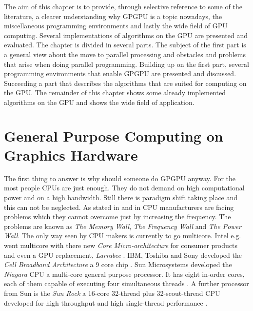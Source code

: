 The aim of this chapter is to provide, through selective reference to some
of the literature, a clearer understanding why \gls{GPGPU} is a topic nowadays,
the miscellaneous programming environments and lastly the wide field of \gls{GPU}
computing. Several implementations of algorithms on the \gls{GPU} are presented
and evaluated. 
The chapter is divided in several parts. The subject of the first part is a
general view about the move to parallel processing and obstacles and problems
that arise when doing parallel programming. Building up on the first part,
several programming environments that enable \gls{GPGPU} are presented and
discussed. Succeeding a part that describes the algorithms that are suited for
computing on the \gls{GPU}. The remainder of this chapter shows some already
implemented algorithms on the \gls{GPU} and shows the wide field of application.




\section{General Purpose Computing on Graphics Hardware} %
\label{sec:gpgpu}

The first thing to answer is why should someone do \gls{GPGPU} anyway. For the
most people \glspl{CPU} are just enough. They do not demand on high
computational power and on a high bandwidth. Still there is paradigm shift
taking place and this can not be neglected. As stated in
\citep{citeulike:1187394} and in \citep{citeulike:3421647} \gls{CPU}
manufacturers are facing problems which they cannot overcome just by increasing
the frequency. The problems are known as \emph{The Memory
Wall}\citep{citeulike:457955}, \emph{The Frequency Wall} and \emph{The Power
Wall}. The only way seen by \gls{CPU} makers is currently to go multicore.
Intel e.g. went multicore with there new \emph{Core Micro-architecture} for
consumer products and even a \gls{GPU} replacement, \emph{Larrabee}
\citep{citeulike:3153758}. \Gls{IBM}, Toshiba and Sony developed the \emph{Cell
Broadband Architecture} a 9 core chip \citep{citeulike:1243173}. Sun Microsystems
developed the \emph{Niagara} \gls{CPU} a multi-core general purpose processor. 
It has eight in-order cores, each of them capable of executing four simultaneous threads
\citep{citeulike:3743958}. A further processor from Sun is the \emph{Sun Rock} a
16-core 32-thread plus 32-scout-thread \gls{CPU} developed for high throughput
and high single-thread performance \citep{citeulike:6643579}.

